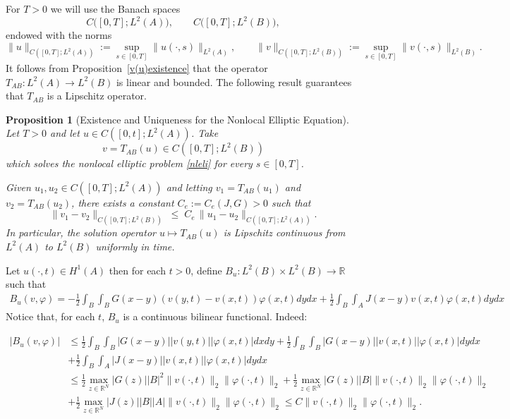 \documentclass[reqno]{amsart}
\numberwithin{equation}{section}
\newtheorem{proposition}[theorem]{Proposition}
\begin{document}
For $T>0$ we will use the Banach spaces
\[
C\big([0,T];L^{2}(A)\big), \qquad 
C\big([0,T];L^{2}(B)\big),
\]
endowed with the norms
\[
\|u\|_{C([0,T];L^{2}(A))}
:= \sup_{s\in[0,T]} \|u(\cdot,s)\|_{L^{2}(A)},\qquad
\|v\|_{C([0,T];L^{2}(B))}
:= \sup_{s\in[0,T]} \|v(\cdot,s)\|_{L^{2}(B)}.
\]
It follows from Proposition~\ref{v(u)existence} that the operator $T_{AB}:L^{2}(A)\to L^{2}(B)$ 
is linear and bounded. The following result guarantees that $T_{AB}$ is a Lipschitz operator.

\begin{proposition}[Existence and Uniqueness for the Nonlocal Elliptic Equation]\label{EUnlp-e}
Let $T>0$ and let $u\in C([0,t];L^{2}(A))$. Take
\[v=T_{AB}(u)\in C([0,T];L^{2}(B))
\]
which solves the nonlocal elliptic problem \eqref{nleli} for every $s\in[0,T]$. 

Given $u_{1},u_{2}\in C([0,T];L^{2}(A))$ and letting 
$v_{1}=T_{AB}(u_1)$ and $v_{2}=T_{AB}(u_2)$, there exists a constant 
$C_e:=C_e(J,G)>0$ such that
\begin{equation}\label{vunormp-e}
    \|v_{1}-v_{2}\|_{C([0,T];L^{2}(B))}
    \;\le\; C_e\,\|u_{1}-u_{2}\|_{C([0,T];L^{2}(A))}.
\end{equation}
In particular, the solution operator $u\mapsto T_{AB}(u)$ is Lipschitz continuous from 
$L^{2}(A)$ to $L^{2}(B)$ uniformly in time.
\end{proposition}


\iffalse
Let $u(\cdot,t)\in H^1(A)$ then for each $t>0$, define $B_u:L^2(B)\times L^2(B)\to \mathbb{R}$ such that
\begin{align}
    B_u(v,\varphi)=-\frac{1}{2}
    \int_B\int_B G(x-y)(v(y,t)-v(x,t))\varphi(x,t)dydx+\frac{1}{2}\int_B\int_A J(x-y)v(x,t)\varphi(x,t)dydx
\end{align}
Notice that, for each $t$, $B_u$ is a continuous bilinear functional. Indeed:

\begin{align*}
    |B_u(v,\varphi)|&\leq \frac{1}{2}
    \int_B\int_B |G(x-y)||v(y,t)||\varphi(x,t)|dxdy+\frac{1}{2}
    \int_B\int_B |G(x-y)||v(x,t)||\varphi(x,t)|dydx\\&+\frac{1}{2}\int_B\int_A |J(x-y)||v(x,t)||\varphi(x,t)|dydx \\
    &\leq \frac{1}{2}\max_{z\in \mathbb{R}^N} |G(z)||B|^2\|v(\cdot,t)\|_2\|\varphi(\cdot,t)\|_2+\frac{1}{2}\max_{z\in \mathbb{R}^N} |G(z)||B|\|v(\cdot,t)\|_2\|\varphi(\cdot,t)\|_2\\
    &+\frac{1}{2}\max_{z\in \mathbb{R}^N} |J(z)||B||A|\|v(\cdot,t)\|_2\|\varphi(\cdot,t)\|_2 \leq C \|v(\cdot,t)\|_2\|\varphi(\cdot,t)\|_2.
\end{align*}
\end{document}
